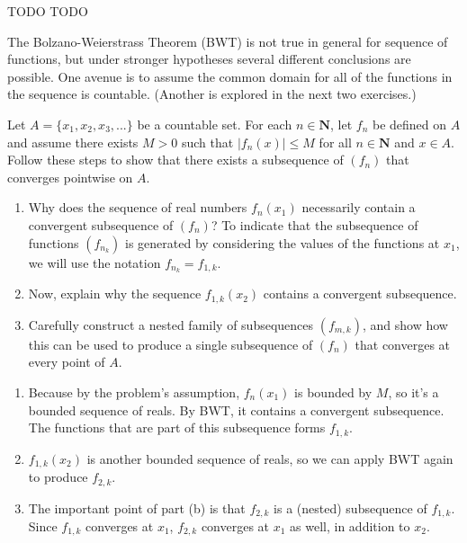 \documentclass{oxmathproblems}
\begin{document}
\begin{questions}
\begin{solution}
\end{solution}

\miquestion TODO
\miquestion TODO

\miquestion The Bolzano-Weierstrass Theorem (BWT) is not true in general for sequence of functions, but under stronger hypotheses several different conclusions are possible. One
avenue is to assume the common domain for all of the functions in the sequence is countable. (Another is explored in the next two exercises.)

Let $A = \{x_{1}, x_{2}, x_{3}, ...\}$ be a countable set. For each $n \in \textbf{N}$, let $f_{n}$ be defined on $A$ and assume there exists $M > 0$ such that $|f_{n}(x)| \leq M$ for all
$n \in \textbf{N}$ and $x \in A$. Follow these steps to show that there exists a subsequence of $(f_{n})$ that converges pointwise on $A$.
\begin{enumerate}[label=(\alph*)]
  \item Why does the sequence of real numbers $f_{n}(x_{1})$ necessarily contain a convergent subsequence of $(f_{n})$? To indicate that the subsequence of functions $(f_{n_{k}})$ is generated
  by considering the values of the functions at $x_{1}$, we will use the notation $f_{n_{k}}=f_{1,k}$.
  \item Now, explain why the sequence $f_{1, k}(x_{2})$ contains a convergent subsequence.
  \item Carefully construct a nested family of subsequences $(f_{m, k})$, and show how this can be used to produce a single subsequence of $(f_{n})$ that converges at every point of $A$.  
\end{enumerate}

\begin{solution}
  \begin{enumerate}[label=(\alph*)]
    \item Because by the problem's assumption, $f_{n}(x_{1})$ is bounded by $M$, so it's a bounded sequence of reals. By BWT, it contains a convergent subsequence. The functions that are part of
    this subsequence forms $f_{1, k}$.
    \item $f_{1,k}(x_{2})$ is another bounded sequence of reals, so we can apply BWT again to produce $f_{2, k}$.
    \item The important point of part (b) is that $f_{2, k}$ is a (nested) subsequence of $f_{1, k}$. Since $f_{1, k}$ converges at $x_{1}$, $f_{2, k}$ converges
    at $x_{1}$ as well, in addition to $x_{2}$.


\end{enumerate}
\end{solution}
\end{questions}
\end{document}
